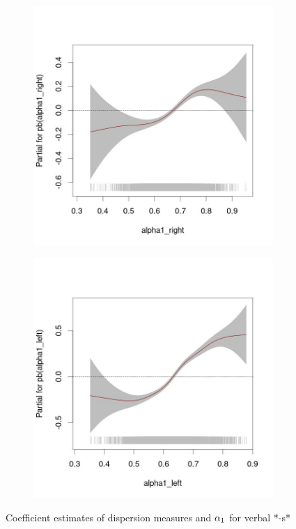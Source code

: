 \documentclass[
]{article}
\begin{document}
\begin{figure}[t!]
\begin{subfigure}[b]{0.49\textwidth}
     \end{subfigure}
     \hfill
     \begin{subfigure}[b]{0.49\textwidth}
         \centering
         \includegraphics[width=\textwidth]{figures/m_noun_mu_alpha1_right.jpg}
     \end{subfigure}
     \hfill
     \begin{subfigure}[b]{0.49\textwidth}
         \centering
         \includegraphics[width=\textwidth]{figures/m_noun_mu_alpha1_left.jpg}
     \end{subfigure}
     \caption{Coefficient estimates of dispersion measures and $\alpha\textsubscript{1}$ for verbal *-s*}
     \label{other_coefs_verb}
\end{figure}
\end{document}
